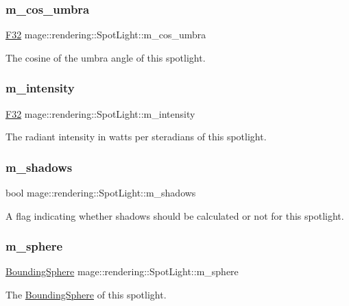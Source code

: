 \subsubsection{\texorpdfstring{m\+\_\+cos\+\_\+umbra}{m\_cos\_umbra}}
{\footnotesize\ttfamily \hyperlink{namespacemage_aa97e833b45f06d60a0a9c4fc22ae02c0}{F32} mage\+::rendering\+::\+Spot\+Light\+::m\+\_\+cos\+\_\+umbra\hspace{0.3cm}{\ttfamily [private]}}

The cosine of the umbra angle of this spotlight. \hypertarget{classmage_1_1rendering_1_1_spot_light_af91b9fc5303e5c2c5e90337f42db015c}{}\label{classmage_1_1rendering_1_1_spot_light_af91b9fc5303e5c2c5e90337f42db015c} 
\subsubsection{\texorpdfstring{m\+\_\+intensity}{m\_intensity}}
{\footnotesize\ttfamily \hyperlink{namespacemage_aa97e833b45f06d60a0a9c4fc22ae02c0}{F32} mage\+::rendering\+::\+Spot\+Light\+::m\+\_\+intensity\hspace{0.3cm}{\ttfamily [private]}}

The radiant intensity in watts per steradians of this spotlight. \hypertarget{classmage_1_1rendering_1_1_spot_light_aa2e1e955cf9fb12a9e064cc523cbbe26}{}\label{classmage_1_1rendering_1_1_spot_light_aa2e1e955cf9fb12a9e064cc523cbbe26} 
\subsubsection{\texorpdfstring{m\+\_\+shadows}{m\_shadows}}
{\footnotesize\ttfamily bool mage\+::rendering\+::\+Spot\+Light\+::m\+\_\+shadows\hspace{0.3cm}{\ttfamily [private]}}

A flag indicating whether shadows should be calculated or not for this spotlight. \hypertarget{classmage_1_1rendering_1_1_spot_light_a24667e6bec37a402627c20283795de95}{}\label{classmage_1_1rendering_1_1_spot_light_a24667e6bec37a402627c20283795de95} 
\subsubsection{\texorpdfstring{m\+\_\+sphere}{m\_sphere}}
{\footnotesize\ttfamily \hyperlink{classmage_1_1_bounding_sphere}{Bounding\+Sphere} mage\+::rendering\+::\+Spot\+Light\+::m\+\_\+sphere\hspace{0.3cm}{\ttfamily [private]}}

The \hyperlink{classmage_1_1_bounding_sphere}{Bounding\+Sphere} of this spotlight. 